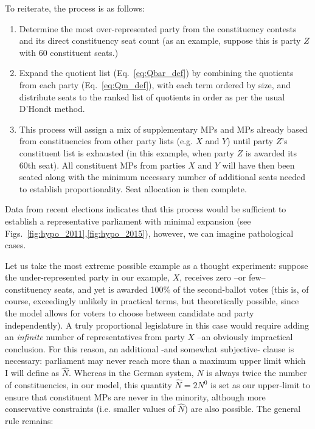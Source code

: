 \documentclass[DIV=calc, paper=a4, fontsize=11pt, twocolumn]{scrartcl}	 %
\begin{document}
To reiterate, the process is as follows:
\begin{enumerate}
\item Determine the most over-represented party from the constituency contests and its direct constituency seat count (as an example, suppose this is party $Z$ with 60 constituent seats.)
\item Expand the quotient list (Eq.~\ref{eq:Qbar_def}) by combining the quotients from each party (Eq.~\ref{eq:Qm_def}), with each term ordered by size, and distribute seats to the ranked list of quotients in order as per the usual D'Hondt method. 
\item This process will assign a mix of supplementary MPs and MPs already based from constituencies from other party lists (e.g. $X$ and $Y$) until party $Z$'s constituent list is exhausted (in this example, when party $Z$ is awarded its 60th seat). All constituent MPs from parties $X$ and $Y$ will have then been seated along with the minimum necessary number of additional seats needed to establish proportionality. Seat allocation is then complete.
\end{enumerate}

Data from recent elections indicates that this process would be sufficient to establish a representative parliament with minimal expansion (see Figs.~\ref{fig:hypo_2011},\ref{fig:hypo_2015}), however, we can imagine pathological cases. 

Let us take the most extreme possible example as a thought experiment: suppose the under-represented party in our example, $X$, receives zero \---or few\--- constituency seats, and yet is awarded 100\% of the second-ballot votes (this is, of course, exceedingly unlikely in practical terms, but theoretically possible, since the model allows for voters to choose between candidate and party independently). 
A truly proportional legislature in this case would require adding an \emph{infinite} number of representatives from party \textbf{$X$} \---an obviously impractical conclusion. For this reason, an additional \--and somewhat subjective\-- clause is necessary: parliament may never reach more than a maximum upper limit which I will define as $\hat N$. Whereas in the German system, $N$ is always  twice the number of constituencies, in our model, this quantity $\hat N = 2 N^0$ is set as our upper-limit to ensure that constituent MPs are never in the minority, although more conservative constraints (i.e. smaller values of $\hat N$) are also possible. The general rule remains:
\end{document}
